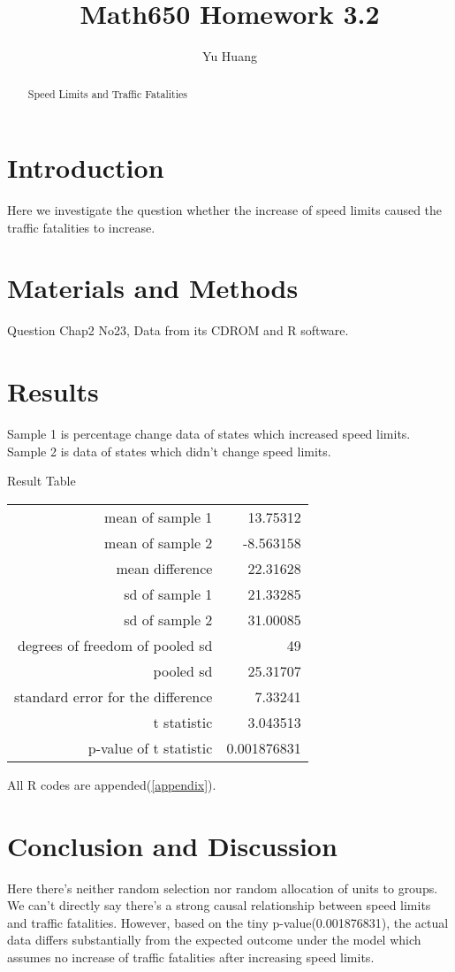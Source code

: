 \documentclass[a4paper,10pt]{article}
\title{Math650 Homework 3.2}
\author{Yu Huang}
\begin{document}
\maketitle

\begin{abstract}
Speed Limits and Traffic Fatalities
\end{abstract}

\section{Introduction}
Here we investigate the question whether the increase of speed limits caused the traffic fatalities to increase.

\section{Materials and Methods}
Question Chap2 No23, Data from its CDROM and R software.


\section{Results}
Sample 1 is percentage change data of states which increased speed limits. Sample 2 is data of states which didn't change speed limits.

Result Table
\begin{tabular}{|r|r|}
\hline
mean of sample 1 & 13.75312\\
mean of sample 2 & -8.563158\\
mean difference & 22.31628\\
sd of sample 1& 21.33285\\
sd of sample 2& 31.00085\\
degrees of freedom of pooled sd & 49\\
pooled sd & 25.31707\\
standard error for the difference & 7.33241\\
t statistic & 3.043513\\
p-value of t statistic & 0.001876831\\
\hline
\end{tabular}

All R codes are appended(\ref{appendix}).

\section{Conclusion and Discussion}
Here there's neither random selection nor random allocation of units to groups. We can't directly say there's a strong causal relationship between speed limits and traffic fatalities. However, based on the tiny p-value(0.001876831), the actual data differs substantially from the expected outcome under the model which assumes no increase of traffic fatalities after increasing speed limits.
\end{document}
